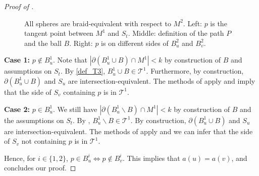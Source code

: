 \documentclass[10pt,a4paper]{amsart}
\newcommand{\T}{\mathcal{T}}
\newcommand{\control}[2]{ ($#2+#1$) .. #1}
\begin{document}
\begin{proof}[Proof of ]
\begin{figure}[ht]
\begin{center}
\caption{All spheres are braid-equivalent with respect to $M^2$. Left: $p$ is the tangent point between $M^1$ and $S_t$. Middle: definition of the path $P$ and the ball $B$. Right: $p$ is on different sides of $B^2_u$ and $B^2_v$.}
\label{pic_lem_16_ex}
\end{center}
\end{figure}

\noindent
{\bf Case 1:} $p \not\in B^1_u$. Note that $|\partial(B^1_u \cup B) \cap M^1 | < k$ by construction of $B$ and assumptions on $S_t$. By \ref{def_T3}, $B^1_u \cup B \in \T^1$. Furthermore, by construction, $\partial (B^1_u \cup B)$ and $S_u$ are intersection-equivalent. The methods of  apply and imply that the side of $S_v$ containing $p$ is in $\T^1$.

\noindent
{\bf Case 2:} $p \in B^1_u$. We still have $|\partial(B^1_u \smallsetminus B) \cap M^1 | < k$ by construction of $B$ and the assumptions on $S_t$. By , $B^1_u \smallsetminus B \in \T^1$. By construction, $\partial (B^1_u \cup B)$ and $S_u$ are intersection-equivalent. The methods of  apply and we can infer that the side of $S_v$ not containing $p$ is in $\T^1$.

Hence, for $i \in \{1,2\}$, $p \in B^i_u \Leftrightarrow p \not \in B^i_v$. This implies that $a(u) = a(v)$, and concludes our proof. 
\end{proof}
\end{document}
